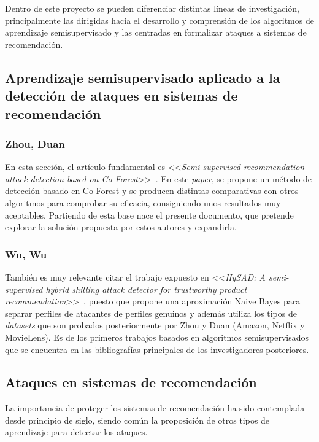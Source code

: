
Dentro de este proyecto se pueden diferenciar distintas líneas de investigación, principalmente las dirigidas hacia el desarrollo y comprensión de los algoritmos de aprendizaje semisupervisado y las centradas en formalizar ataques a sistemas de recomendación.


\subsection{Aprendizaje semisupervisado aplicado a la detección de ataques en sistemas de recomendación}

\subsubsection{Zhou, Duan~\cite{zhou2021SemisupervisedRecommendationAttack}}
En esta sección, el artículo fundamental es <<\textit{Semi-supervised recommendation attack detection based on Co-Forest}>>~\cite{zhou2021SemisupervisedRecommendationAttack}. En este \textit{paper}, se propone un método de detección basado en Co-Forest y se producen distintas comparativas con otros algoritmos para comprobar su eficacia, consiguiendo unos resultados muy aceptables. Partiendo de esta base nace el presente documento, que pretende explorar la solución propuesta por estos autores y expandirla.

\subsubsection{Wu, Wu~\cite{zhiang2012HySADNayveBayes}}
También es muy relevante citar el trabajo expuesto en <<\textit{HySAD: A semi-supervised hybrid shilling attack detector for trustworthy product recommendation}>>~\cite{zhiang2012HySADNayveBayes}, puesto que propone una aproximación Naive Bayes para separar perfiles de atacantes de perfiles genuinos y además utiliza los tipos de \textit{datasets} que son probados posteriormente por Zhou y Duan (Amazon, Netflix y MovieLens). Es de los primeros trabajos basados en algoritmos semisupervisados que se encuentra en las bibliografías principales de los investigadores posteriores.

\subsection{Ataques en sistemas de recomendación}

La importancia de proteger los sistemas de recomendación ha sido contemplada desde principio de siglo, siendo común la proposición de otros tipos de aprendizaje para detectar los ataques.


